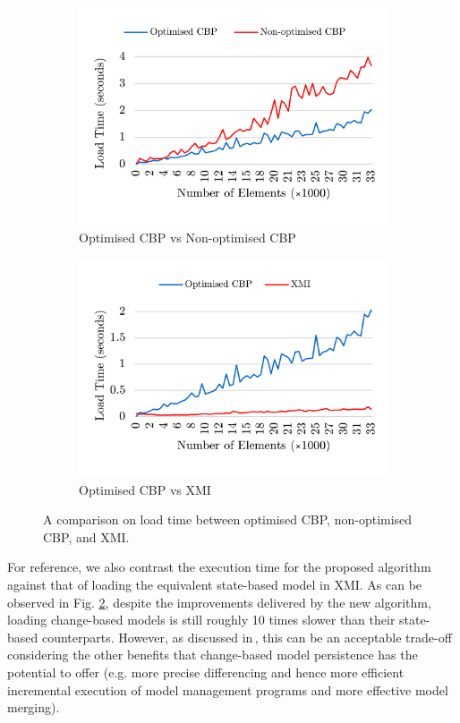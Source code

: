 \documentclass{llncs}
\begin{document}
\begin{figure}[ht]	
    \begin{subfigure}[t]{0.5\linewidth}
		\includegraphics[width=\linewidth]{loading_speed_conf}
		\caption{Optimised CBP vs Non-optimised CBP}\label{fig:loading_speed_conf}
	\end{subfigure}
	\hfill
	\begin{subfigure}[t]{0.5\linewidth}
		\includegraphics[width=\linewidth]{loading_speed_conf_ocbp_xmi}
		\caption{Optimised CBP vs XMI}\label{fig:loading_speed_conf_ocbp_xmi}		
	\end{subfigure}	
	\caption{A comparison on load time between optimised CBP, non-optimised CBP, and XMI.}
	\label{fig:loading_speed}
\end{figure}

For reference, we also contrast the execution time for the proposed algorithm against that of loading the equivalent state-based model in XMI. As can be observed in Fig. \ref{fig:loading_speed_conf_ocbp_xmi}, despite the improvements delivered by the new algorithm, loading change-based models is still roughly 10 times slower than their state-based counterparts. However, as discussed in\,\cite{yohannis2017turning}, this can be an acceptable trade-off considering the other benefits that change-based model persistence has the potential to offer (e.g. more precise differencing and hence more efficient incremental execution of model management programs and more effective model merging).
\end{document}
